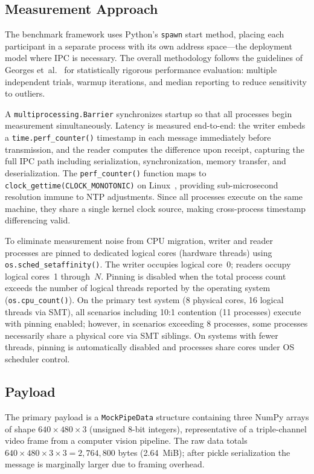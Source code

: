 \newpage
\subsection{Measurement Approach}

The benchmark framework uses Python's \texttt{spawn} start method, placing each participant in a separate process with its own address space---the deployment model where IPC is necessary. The overall methodology follows the guidelines of Georges et~al.~\cite{georges2007} for statistically rigorous performance evaluation: multiple independent trials, warmup iterations, and median reporting to reduce sensitivity to outliers.

A \texttt{multiprocessing.Barrier} synchronizes startup so that all processes begin measurement simultaneously. 
Latency is measured end-to-end: the writer embeds a \texttt{time.perf\_counter()} timestamp in each message immediately before transmission, and the reader computes the difference upon receipt, capturing the full IPC path including serialization, synchronization, memory transfer, and deserialization. 
The \texttt{perf\_counter()} function maps to \texttt{clock\_gettime(CLOCK\_MONOTONIC)} on Linux~\cite{kerrisk2010}, providing sub-microsecond resolution immune to NTP adjustments. Since all processes execute on the same machine, they share a single kernel clock source, making cross-process timestamp differencing valid.

To eliminate measurement noise from CPU migration, writer and reader processes are pinned to dedicated logical cores (hardware threads) using \texttt{os.sched\_set\-affinity()}.
The writer occupies logical core~0; readers occupy logical cores~1 through~$N$.
Pinning is disabled when the total process count exceeds the number of logical threads reported by the operating system (\texttt{os.cpu\_count()}). On the primary test system (8 physical cores, 16 logical threads via SMT), all scenarios including 10:1 contention (11 processes) execute with pinning enabled; however, in scenarios exceeding 8 processes, some processes necessarily share a physical core via SMT siblings. On systems with fewer threads, pinning is automatically disabled and processes share cores under OS scheduler control.

\subsection{Payload}

The primary payload is a \texttt{MockPipeData} structure containing three NumPy arrays of shape $640 \times 480 \times 3$ (unsigned 8-bit integers), representative of a triple-channel video frame from a computer vision pipeline. The raw data totals $640 \times 480 \times 3 \times 3 = 2{,}764{,}800$ bytes (2.64~MiB); after pickle serialization the message is marginally larger due to framing overhead.

